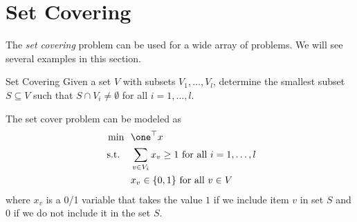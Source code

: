 \section{Set Covering}

The \emph{set covering} problem can be used for a wide array of problems.    We will see several examples in this section.

\begin{general}{Set Covering}{\npcomplete}
\label{general:set-covering}
Given a set $V$ with subsets $V_1, \dots, V_l$, determine the smallest subset $S \subseteq V$ such that 
$S \cap V_i \neq \emptyset$ for all $i=1, \dots, l$.

The set cover problem can be modeled as
\begin{equation}
\begin{split}
\min \ \ & \one^\top x\\
\st \ \ & \sum_{v \in V_i} x_v \geq 1 \text{ for all } i =1, \dots, l \\ 
& x_v \in \{0,1\} \text{ for all } v \in V
\end{split}
\end{equation}
where $x_v$ is a 0/1 variable that takes the value $1$ if we include item $v$ in set $S$ and $0$ if we do not include it in the set $S$.  
\end{general}


